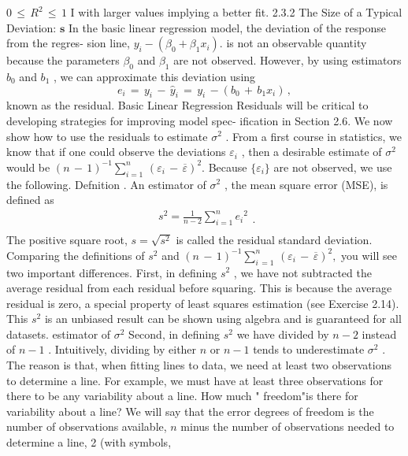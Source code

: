 \documentclass[11pt]{article}
\begin{document}
\(0 \, \leq\, R^{2} \, \leq\, 1\) I with larger values implying a better fit.
2.3.2 The Size of a Typical Deviation: \(\boldsymbol{s}\)
In the basic linear regression model, the deviation of the response from the regres-
 sion line, \(y_{i}-( \beta_{0}+\beta_{1} x_{i} ) .\) is not an observable quantity because the parameters
\(\beta_{0}\) and \(\beta_{1}\) are not observed. However, by using estimators \(b_{0}\) and \(b_{1}\) , we can
 approximate this deviation using
\[
e_{i} \,=\, y_{i} \,-\, \widehat{y}_{i} \,=\, y_{i} \,-( b_{0} \,+\, b_{1} x_{i} ) \, ,
\]
 known as the residual.
 Basic Linear Regression
Residuals will be critical to developing strategies for improving model spec-
ification in Section 2.6. We now show how to use the residuals to estimate \(\sigma^{2}\) .
From a first course in statistics, we know that if one could observe the deviations
\(\varepsilon_{i}\) , then a desirable estimate of \(\sigma^{2}\) would be \(( n \,-\, 1 )^{-1} \sum_{i=1}^{n} \, \left( \varepsilon_{i} \,-\, \overline{{\varepsilon}} \right)^{2} .\) Because
\(\{\varepsilon_{i} \}\) are not observed, we use the following.
Defnition . An estimator of \(\sigma^{2}\) , the mean square error (MSE), is defined as
\[
\begin{aligned} {s^{2}=\frac{1} {n-2} \sum_{i=1}^{n} {e_{i}}^{2}} \\ \end{aligned} . \tag{2.3}
\]
The positive square root, \(s=\sqrt{s^{2}}\) is called the residual standard deviation.
Comparing the definitions of \(s^{2}\) and \(( n \,-\, 1 )^{-1} \sum_{i \,=1}^{n} \, ( \varepsilon_{i} \,-\, \overline{{\varepsilon}} )^{2} ,\) you will see two
important differences. First, in defining \(s^{2}\) , we have not subtracted the average
residual from each residual before squaring. This is because the average residual
is zero, a special property of least squares estimation (see Exercise 2.14). This
\(s^{2}\) is an unbiased result can be shown using algebra and is guaranteed for all datasets.
estimator of \(\sigma^{2}\) Second, in defining \(s^{2}\) we have divided by \(n-2\) instead of \(n-1\) . Intuitively,
 dividing by either \(n\) or \(n-1\) tends to underestimate \(\sigma^{2}\) . The reason is that, when
fitting lines to data, we need at least two observations to determine a line. For
example, we must have at least three observations for there to be any variability
about a line. How much " freedom"is there for variability about a line? We will
 say that the error degrees of freedom is the number of observations available, \(n\)
minus the number of observations needed to determine a line, 2 (with symbols,
\end{document}
